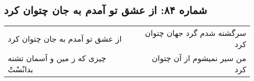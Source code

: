 \begin{center}
\section*{شماره ۸۴: از عشق تو آمدم به جان چتوان کرد}
\label{sec:084}
\begin{longtable}{l p{0.5cm} r}
از عشق تو آمدم به جان چتوان کرد
&&
سرگشته شدم گرد جهان چتوان کرد
\\
چیزی که ز مین و آسمان تشنه بدانْسْتْ
&&
من سیر نمیشوم از آن چتوان کرد
\\
\end{longtable}
\end{center}
